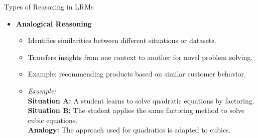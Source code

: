 \begin{frame}[allowframebreaks]{Types of Reasoning in LRMs}
\begin{itemize}
        \begin{itemize}
            \item Infers the most likely explanation from incomplete or uncertain evidence.
            \item Generates hypotheses rather than definitive answers.
            \item Effective in domains like medical diagnostics, where plausible interpretations are needed.
            \item \textit{Example:} \\
            \textbf{Evidence:} The lawn is wet in the morning. \\
            \textbf{Possible explanations:} It rained overnight, or the sprinkler was on. \\
            \textbf{Abduction:} If the weather report says no rain, the most likely explanation is the sprinkler was on.
        \end{itemize}
    \framebreak
        \item \textbf{Analogical Reasoning}
        \begin{itemize}
            \item Identifies similarities between different situations or datasets.
            \item Transfers insights from one context to another for novel problem solving.
            \item Example: recommending products based on similar customer behavior.
            \item \textit{Example:} \\
            \textbf{Situation A:} A student learns to solve quadratic equations by factoring. \\
            \textbf{Situation B:} The student applies the same factoring method to solve cubic equations. \\
            \textbf{Analogy:} The approach used for quadratics is adapted to cubics.
        \end{itemize}
    \end{itemize}
\end{frame}